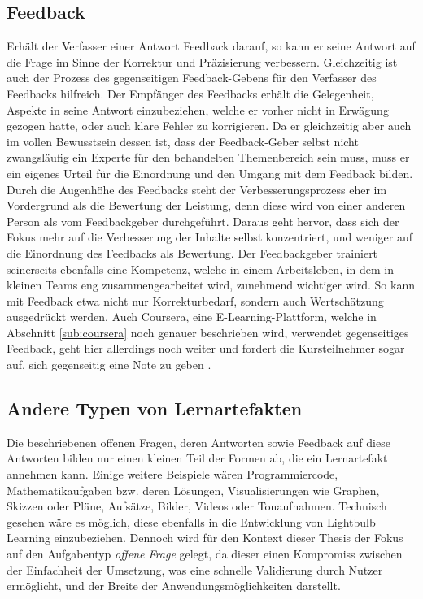 \subsection{Feedback}
Erhält der Verfasser einer Antwort Feedback darauf, so kann er seine Antwort auf die Frage im Sinne der Korrektur und Präzisierung verbessern. Gleichzeitig ist auch der Prozess des gegenseitigen Feedback-Gebens für den Verfasser des Feedbacks hilfreich. Der Empfänger des Feedbacks erhält die Gelegenheit, Aspekte in seine Antwort einzubeziehen, welche er vorher nicht in Erwägung gezogen hatte, oder auch klare Fehler zu korrigieren. Da er gleichzeitig aber auch im vollen Bewusstsein dessen ist, dass der Feedback-Geber selbst nicht zwangsläufig ein Experte für den behandelten Themenbereich sein muss, muss er ein eigenes Urteil für die Einordnung und den Umgang mit dem Feedback bilden. Durch die Augenhöhe des Feedbacks steht der Verbesserungsprozess eher im Vordergrund als die Bewertung der Leistung, denn diese wird von einer anderen Person als vom Feedbackgeber durchgeführt. Daraus geht hervor, dass sich der Fokus mehr auf die Verbesserung der Inhalte selbst konzentriert, und weniger auf die Einordnung des Feedbacks als Bewertung. Der Feedbackgeber trainiert seinerseits ebenfalls eine Kompetenz, welche in einem Arbeitsleben, in dem in kleinen Teams eng zusammengearbeitet wird, zunehmend wichtiger wird. So kann mit Feedback etwa nicht nur Korrekturbedarf, sondern auch Wertschätzung ausgedrückt werden. Auch Coursera, eine E-Learning-Plattform, welche in Abschnitt \ref{sub:coursera} noch genauer beschrieben wird, verwendet gegenseitiges Feedback, geht hier allerdings noch weiter und fordert die Kursteilnehmer sogar auf, sich gegenseitig eine Note zu geben \cite{Coursera2022peer}.

\subsection{Andere Typen von Lernartefakten}
Die beschriebenen offenen Fragen, deren Antworten sowie Feedback auf diese Antworten bilden nur einen kleinen Teil der Formen ab, die ein Lernartefakt annehmen kann. Einige weitere Beispiele wären Programmiercode, Mathematikaufgaben bzw. deren Lösungen, Visualisierungen wie Graphen, Skizzen oder Pläne, Aufsätze, Bilder, Videos oder Tonaufnahmen. Technisch gesehen wäre es möglich, diese ebenfalls in die Entwicklung von Lightbulb Learning einzubeziehen. Dennoch wird für den Kontext dieser Thesis der Fokus auf den Aufgabentyp \emph{offene Frage} gelegt, da dieser einen Kompromiss zwischen der Einfachheit der Umsetzung, was eine schnelle Validierung durch Nutzer ermöglicht, und der Breite der Anwendungsmöglichkeiten darstellt.

